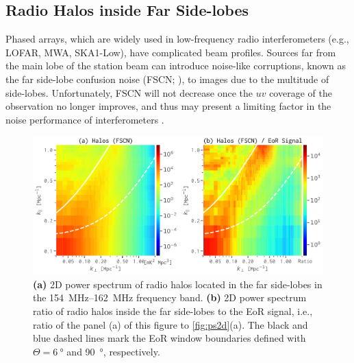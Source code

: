\documentclass[modern]{aastex62}
\begin{document}
{\color{cyan}%
\subsection{Radio Halos inside Far Side-lobes}
\label{sec:far-sidelobes}

Phased arrays, which are widely used in low-frequency radio
interferometers (e.g., LOFAR, MWA, SKA1-Low), have complicated beam
profiles.
Sources far from the main lobe of the station beam can introduce
noise-like corruptions, known as the far side-lobe confusion noise
(FSCN; \citealt{smirnov2012}), to images due to the multitude of
side-lobes.
Unfortunately, FSCN will not decrease once the $uv$ coverage of the
observation no longer improves, and thus may present a limiting factor
in the noise performance of interferometers \citep{mort2017}.

\begin{figure}
  \centering
  \includegraphics[width=\textwidth]{ps2d-fscn-band158}
  \caption{\label{fig:ps2d-fscn}%
    \textbf{(a)} 2D power spectrum of radio halos located in the
    far side-lobes in the \SIrange{154}{162}{\MHz} frequency band.
    \textbf{(b)} 2D power spectrum ratio of radio halos inside the
    far side-lobes to the EoR signal, i.e., ratio of the panel (a)
    of this figure to \autoref{fig:ps2d}(a).
    The black and blue dashed lines mark the EoR window boundaries
    defined with $\Theta = \SI{6}{\degree}$ and \SI{90}{\degree},
    respectively.
  }
\end{figure}

}
\end{document}
